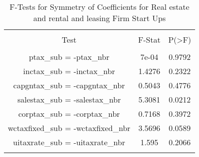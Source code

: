 
\begin{table}[!htbp] \centering 
  \caption{F-Tests for Symmetry of Coefficients for Real estate and rental and leasing Firm Start Ups} 
  \label{53Ftests} 
\begin{tabular}{@{\extracolsep{5pt}} ccc} 
\\[-1.8ex]\hline 
\hline \\[-1.8ex] 
Test & F-Stat & P(\textgreater F) \\ 
\hline \\[-1.8ex] 
ptax\_sub = -ptax\_nbr & 7e-04 & 0.9792 \\ 
inctax\_sub = -inctax\_nbr & 1.4276 & 0.2322 \\ 
capgntax\_sub = -capgntax\_nbr & 0.5043 & 0.4776 \\ 
salestax\_sub = -salestax\_nbr & 5.3081 & 0.0212 \\ 
corptax\_sub = -corptax\_nbr & 0.7168 & 0.3972 \\ 
wctaxfixed\_sub = -wctaxfixed\_nbr & 3.5696 & 0.0589 \\ 
uitaxrate\_sub = -uitaxrate\_nbr & 1.595 & 0.2066 \\ 
\hline \\[-1.8ex] 
\end{tabular} 
\end{table} 
